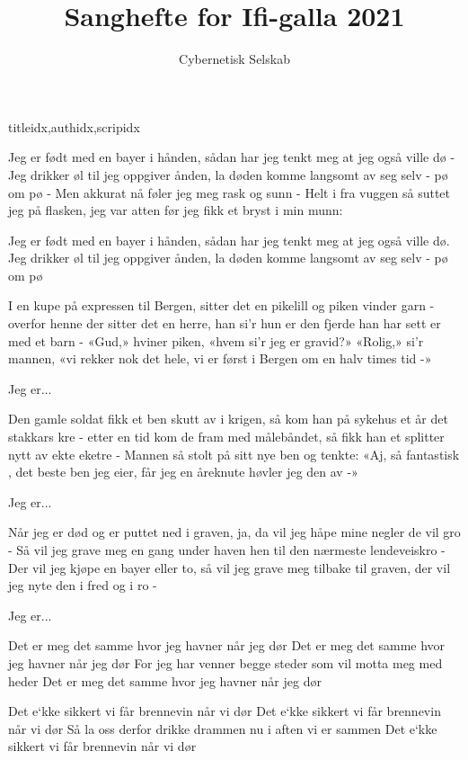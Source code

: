 \documentclass[14pt,letterpaper,norsk]{article}
\title{Sanghefte for Ifi-galla 2021}
\author{Cybernetisk Selskab}
\date{}
\begin{document}

\newpage

\begin{songs}{titleidx,authidx,scripidx}

\beginverse
Jeg er født med en bayer i hånden,
sådan har jeg tenkt meg at jeg også ville dø -
Jeg drikker øl til jeg oppgiver ånden,
la døden komme langsomt av seg selv - pø om pø -
Men akkurat nå føler jeg meg rask og sunn -
Helt i fra vuggen så suttet jeg på flasken,
jeg var atten før jeg fikk et bryst i min munn:
\endverse

\beginchorus
Jeg er født med en bayer i hånden,
sådan har jeg tenkt meg at jeg også ville dø.
Jeg drikker øl til jeg oppgiver ånden,
la døden komme langsomt av seg selv - pø om pø
\endchorus

\beginverse
I en kupe på expressen til Bergen,
sitter det en pikelill og piken vinder garn -
overfor henne der sitter det en herre,
han si'r hun er den fjerde han har sett er med et barn -
«Gud,» hviner piken, «hvem si'r jeg er gravid?»
«Rolig,» si'r mannen, «vi rekker nok det hele,
vi er først i Bergen om en halv times tid -»
\endverse

\beginchorus
Jeg er...
\endchorus

\beginverse
Den gamle soldat fikk et ben skutt av i krigen,
så kom han på sykehus et år det stakkars kre -
etter en tid kom de fram med målebåndet,
så fikk han et splitter nytt av ekte eketre -
Mannen så stolt på sitt nye ben og tenkte:
«Aj, så fantastisk , det beste ben jeg eier,
får jeg en åreknute høvler jeg den av -»
\endverse

\beginchorus
Jeg er...
\endchorus

\beginverse
Når jeg er død og er puttet ned i graven,
ja, da vil jeg håpe mine negler de vil gro -
Så vil jeg grave meg en gang under haven
hen til den nærmeste lendeveiskro -
Der vil jeg kjøpe en bayer eller to,
så vil jeg grave meg tilbake til graven,
der vil jeg nyte den i fred og i ro -
\endverse

\beginchorus
Jeg er...
\endchorus
\endsong

\beginverse
Det er meg det samme hvor jeg havner når jeg dør
Det er meg det samme hvor jeg havner når jeg dør
For jeg har venner begge steder som vil motta meg med heder
Det er meg det samme hvor jeg havner når jeg dør
\endverse

\beginverse
Det e`kke sikkert vi får brennevin når vi dør
Det e`kke sikkert vi får brennevin når vi dør
Så la oss derfor drikke drammen nu i aften vi er sammen
Det e`kke sikkert vi får brennevin når vi dør
\endverse


\end{songs}
\end{document}
